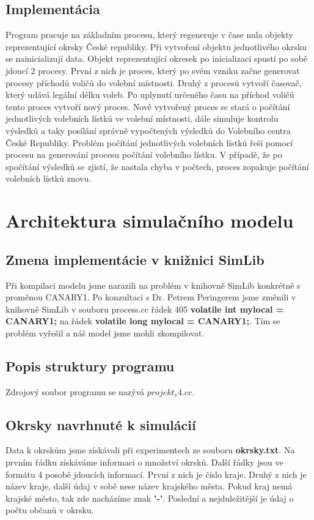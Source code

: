 \documentclass[12pt,a4paper,titlepage,final]{article}
\begin{document}
\subsection{Implementácia}
Program pracuje na základním procesu, který regeneruje v čase nula objekty reprezentující okrsky České republiky. Při vytvoření objektu jednotlivého okrsku se nainicializují data. Objekt reprezentující okresek po inicializaci spustí po sobě jdoucí 2 procesy. První z nich je proces, který po svém vzniku začne generovat procesy příchodů voličů do volební místnosti. Druhý z procesů vytvoří časovač, který udává legální délku voleb. Po uplynutí určeného času na příchod voličů tento proces vytvoří nový proces. Nově vytvořený proces se stará o počítání jednotlivých volebních lístků ve volební místnosti, dále simuluje kontrolu výsledků a taky posílání správně vypočtených výsledků do Volebního centra České Republiky. Problém počítání jednotlivých volebních lístků řeší pomocí procesu na generování procesu počítání volebního lístku. V případě, že po spočítání výsledků se zjistí, že nastala chyba v počtech, proces zopakuje počítání volebních lístků znovu. 


\section{Architektura simulačního modelu}

\subsection{Zmena implementácie v knižnici SimLib}
Při kompilaci modelu jsme narazili na problém v knihovně SimLib konkrétně s proměnou CANARY1. Po konzultaci s Dr. Petrem Peringerem jsme změnili v knihovně SimLib v souboru process.cc řádek 405 \textbf{volatile int mylocal = CANARY1;} na řádek \textbf{volatile long mylocal = CANARY1;}. Tím se problém vyřešil a náš model jsme mohli zkompilovat.

\subsection{Popis struktury programu}
Zdrojový soubor programu  se  nazývá \textbf{$projekt_v4.cc$}.

\subsection{Okrsky navrhnuté k simulácií}
Data k okrskům jsme získávali při experimentech ze souboru \textbf{okrsky.txt}. Na prvním řádku získáváme informaci o množství okrsků. Další řádky jsou ve formátu 4 posobě jdoucích informací. První z nich je číslo kraje. Druhý z nich je název kraje, další údaj v sobě nese název krajského města. Pokud kraj nemá krajské město, tak zde nacházíme znak \textbf{'-'}. Poslední a nejduležitější je údaj o počtu občanů v okrsku.
\end{document}
